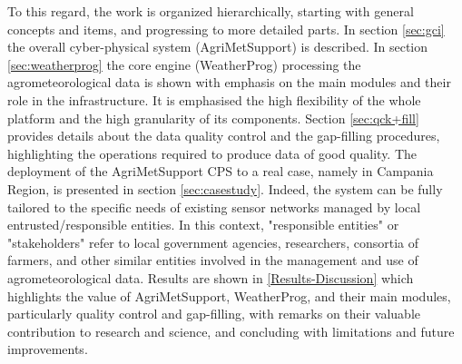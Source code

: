\documentclass[authoryear,preprint,review,12pt]{elsarticle}
\begin{document}

To this regard, the work is organized hierarchically, starting with general concepts and items, and progressing to more detailed parts.
In section \ref{sec:gci} the overall cyber-physical system (Agri\-Met\-Support) is described.
In section \ref{sec:weatherprog} the core engine (WeatherProg) processing the agrometeorological data is shown with emphasis on the main modules and their role in the infrastructure.
It is emphasised the high flexibility of the whole platform and the high granularity of its components.
Section \ref{sec:qck+fill} provides details about the data quality control and the gap-filling procedures, highlighting the operations required to produce data of good quality.
The deployment of the Agri\-Met\-Support CPS to a real case, namely in Campania Region, is presented in section \ref{sec:casestudy}.
Indeed, the system can be fully tailored to the specific needs of existing sensor networks %
managed by local entrusted/responsible entities.
In this context, "responsible entities" or "stakeholders" refer to local government agencies, researchers, consortia of farmers, and other similar entities involved in the management and use of agrometeorological data.
Results are shown in \cref{Results-Discussion} which highlights the value of Agri\-Met\-Support, Weather\-Prog, and their main modules, particularly quality control and gap-filling, with remarks on their valuable contribution to research and science, and concluding with limitations and future improvements. %
\end{document}
